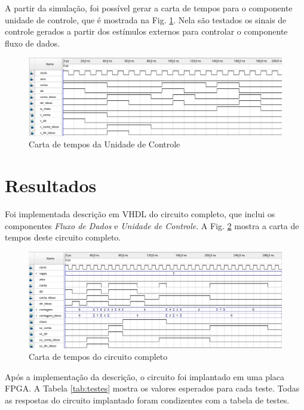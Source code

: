 \documentclass[a4,12pt]{horizon-theme}
\begin{document}
A partir da simulação, foi possível gerar a carta de tempos para o componente unidade de controle, que é mostrada na Fig. \ref{fig:uc_tempos}. Nela são testados os sinais de controle gerados a partir dos estímulos externos para controlar o componente fluxo de dados.

\begin{figure}[!ht]
    \centering
    \includegraphics[width=\textwidth]{uc}
    \caption{Carta de tempos da Unidade de Controle}
    \label{fig:uc_tempos}
\end{figure}



\newpage
\section{Resultados}
\label{sec:resultados}

Foi implementada descrição em VHDL do circuito completo, que inclui os componentes \emph{Fluxo de Dados} e \emph{Unidade de Controle}. A Fig. \ref{fig:completo} mostra a carta de tempos deste circuito completo.

\begin{figure}[!ht]
    \centering
    \includegraphics[width=\textwidth]{completo}
    \caption{Carta de tempos do circuito completo}
    \label{fig:completo}
\end{figure}

Após a implementação da descrição, o circuito foi implantado em uma placa FPGA. A Tabela \ref{tab:testes} mostra os valores esperados para cada teste. Todas as respostas do circuito implantado foram condizentes com a tabela de testes.
\end{document}
